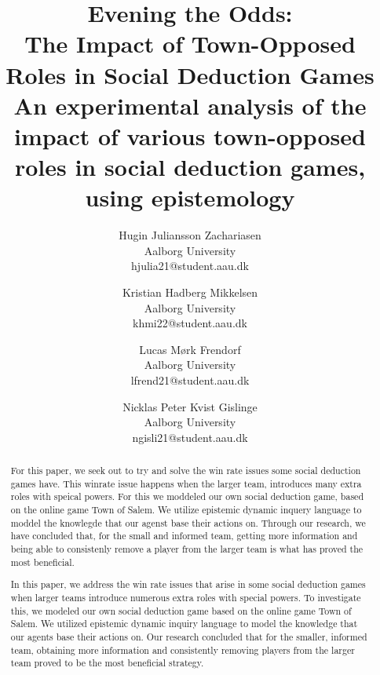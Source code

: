 \documentclass[twocolumn]{article}
\begin{document}

\title{Evening the Odds:\\ The Impact of Town-Opposed Roles in Social Deduction 
Games\\ \small An experimental analysis of the impact of various 
town-opposed roles in social deduction games, using epistemology}
\author{
	Hugin Juliansson Zachariasen \\ Aalborg University \\ hjulia21@student.aau.dk
	\and
	Kristian Hadberg Mikkelsen \\ Aalborg University \\ khmi22@student.aau.dk
	\and
	Lucas Mørk Frendorf \\ Aalborg University \\ lfrend21@student.aau.dk
	\and
	Nicklas Peter Kvist Gislinge \\ Aalborg University \\ ngisli21@student.aau.dk
}
\maketitle
\begin{abstract}
	For this paper, we seek out to try and solve the win rate issues some social deduction games have. This winrate issue happens when the larger team, introduces many extra roles with speical powers. For this we moddeled our own social deduction game, based on the online game Town of Salem. We utilize epistemic dynamic inquery language  to moddel the knowlegde that our agenst base their actions on. Through our research, we have concluded that, for the small and informed team, getting more information and being able to consistenly remove a player from the larger team is what has proved the most beneficial.

In this paper, we address the win rate issues that arise in some social deduction games when larger teams introduce numerous extra roles with special powers. To investigate this, we modeled our own social deduction game based on the online game Town of Salem. We utilized epistemic dynamic inquiry language to model the knowledge that our agents base their actions on. Our research concluded that for the smaller, informed team, obtaining more information and consistently removing players from the larger team proved to be the most beneficial strategy.
\end{abstract}










\clearpage
\appendix
\makeatletter
\def\@seccntformat#1{\appendixname\ \csname the#1\endcsname: }
\makeatother




\clearpage
\printbibliography[heading=bibintoc, title=Bibliography]
\label{bib:mybiblio}
\end{document}
